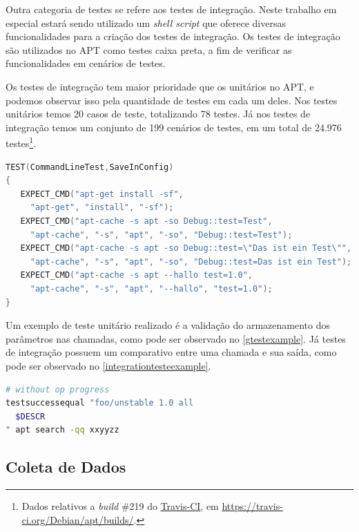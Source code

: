 Outra categoria de testes se refere aos testes de integração. Neste trabalho em especial estará sendo utilizado um \textit{shell script} que oferece diversas funcionalidades para a criação dos testes de integração. Os testes de integração são utilizados no {\code APT} como testes caixa preta, a fim de verificar as funcionalidades em cenários de testes.

Os testes de integração tem maior prioridade que os unitários no APT, e podemos observar isso pela quantidade de testes em cada um deles. Nos testes unitários temos 20 casos de teste, totalizando 78 testes. Já nos testes de integração temos um conjunto de 199 cenários de testes, em um total de 24.976 testes\footnote{Dados relativos a \textit{build} \#219 do \href{https://travis-ci.org/Debian/apt/builds/}{Travis-CI}, em \url{https://travis-ci.org/Debian/apt/builds/}.}.


\begin{lstlisting}[language=C++,label=gtestexample,caption={Teste de validação de armazenamento de parâmetros}]
TEST(CommandLineTest,SaveInConfig)
{
   EXPECT_CMD("apt-get install -sf",
	 "apt-get", "install", "-sf");
   EXPECT_CMD("apt-cache -s apt -so Debug::test=Test",
	 "apt-cache", "-s", "apt", "-so", "Debug::test=Test");
   EXPECT_CMD("apt-cache -s apt -so Debug::test=\"Das ist ein Test\"",
	 "apt-cache", "-s", "apt", "-so", "Debug::test=Das ist ein Test");
   EXPECT_CMD("apt-cache -s apt --hallo test=1.0",
	 "apt-cache", "-s", "apt", "--hallo", "test=1.0");
}
\end{lstlisting}

Um exemplo de teste unitário realizado é a validação do armazenamento dos parâmetros nas chamadas, como pode ser observado no \autoref{gtestexample}. Já testes de integração possuem um comparativo entre uma chamada e sua saída, como pode ser observado no \autoref{integrationtesteexample}.

\begin{lstlisting}[language=Bash,label=integrationtesteexample,caption={Teste de verificação de saída para busca}]
# without op progress
testsuccessequal "foo/unstable 1.0 all
  $DESCR
" apt search -qq xxyyzz
\end{lstlisting}



\subsection{Coleta de Dados} %
\label{cha:coleta_de_dados}


